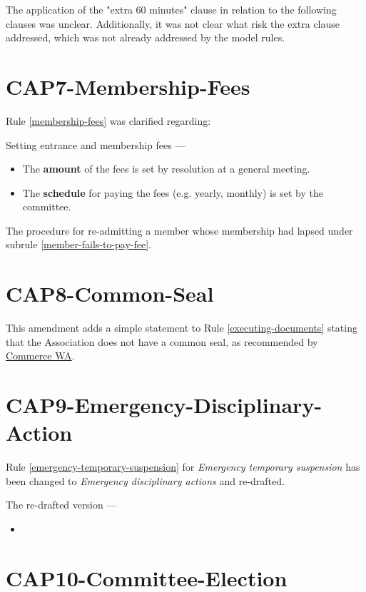 \documentclass[../constitution.tex]{subfiles}
\begin{document}
The application of the "extra 60 minutes" clause in relation to the following clauses was unclear. Additionally, it was not clear what risk the extra clause addressed, which was not already addressed by the model rules.

\section*{CAP7-Membership-Fees}

Rule \ref{membership-fees} was clarified regarding:

Setting entrance and membership fees ---

\begin{itemize}
    \item The \textbf{amount} of the fees is set by resolution at a general meeting.
    \item The \textbf{schedule} for paying the fees (e.g. yearly, monthly) is set by the committee.
\end{itemize}

The procedure for re-admitting a member whose membership had lapsed under subrule \ref{member-fails-to-pay-fee}.

\section*{CAP8-Common-Seal}

This amendment adds a simple statement to Rule \ref{executing-documents} stating that the Association does not have a common seal, as recommended by \href{https://www.commerce.wa.gov.au/publications/whats-rules}{Commerce WA}.

\section*{CAP9-Emergency-Disciplinary-Action}

Rule \ref{emergency-temporary-suspension} for \textit{Emergency temporary suspension} has been changed to \textit{Emergency disciplinary actions} and re-drafted.

The re-drafted version ---

\begin{itemize}
    \item {}
\end{itemize}

\section*{CAP10-Committee-Election}
\end{document}
